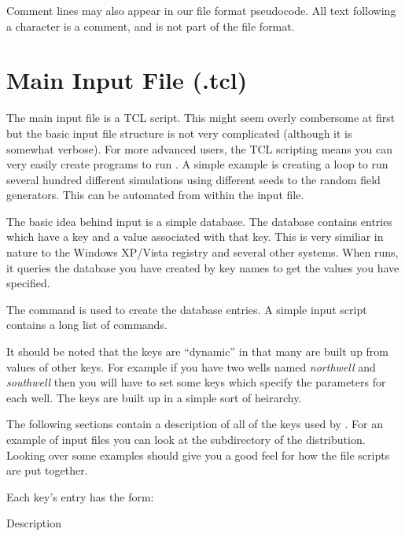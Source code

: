 Comment lines may also appear in our file format pseudocode.
All text following a \code{#} character is a comment,
and is not part of the file format.


\section{Main Input File (.tcl)}
\label{Main Input File (.tcl)}

The main \parflow{} input file is a TCL script.  This might seem
overly combersome at first but the basic input file structure is not
very complicated (although it is somewhat verbose).  For more advanced
users, the TCL scripting means you can very easily create programs to
run \parflow{}.  A simple example is creating a loop to run several
hundred different simulations using different seeds to the random field
generators.  This can be automated from within the \parflow{} input file.

The basic idea behind \parflow{} input is a simple database.  The
database contains entries which have a key and a value associated with
that key.  This is very similiar in nature to the Windows XP/Vista
registry and several other systems.  When \parflow{} runs, it
queries the database you have created by key names to get the values
you have specified.

The command  is used to create the database entries.  A
simple \parflow{} input script contains a long list of
 commands.

It should be noted that the keys are ``dynamic'' in that many are
built up from values of other keys.  For example if you have two wells
named {\em northwell} and {\em southwell} then you will have to set some keys
which specify the parameters for each well.  The keys are built up in
a simple sort of heirarchy.

The following sections contain a description of all of the keys used by
\parflow{}.  For an example of input files you can look at the
 subdirectory of the \parflow{} distribution.  Looking
over some examples should give you a good feel for how the
file scripts are put together.

Each key's entry has the form:

{Description}{}

